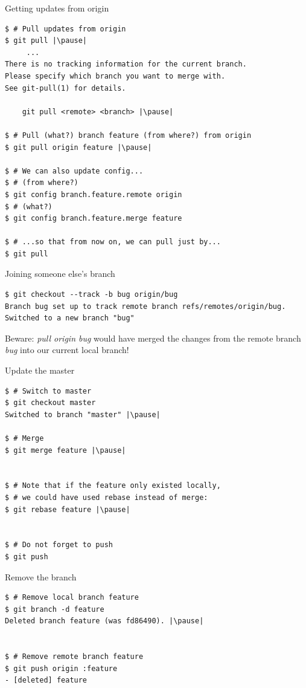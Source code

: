 \begin{frame}[fragile]{Getting updates from origin}
	\begin{lstlisting}
$ # Pull updates from origin
$ git pull |\pause|
     ...
There is no tracking information for the current branch.
Please specify which branch you want to merge with.
See git-pull(1) for details.

    git pull <remote> <branch> |\pause|
    
$ # Pull (what?) branch feature (from where?) from origin
$ git pull origin feature |\pause|

$ # We can also update config...
$ # (from where?)
$ git config branch.feature.remote origin
$ # (what?)
$ git config branch.feature.merge feature

$ # ...so that from now on, we can pull just by...
$ git pull
	\end{lstlisting}
\end{frame}


\begin{frame}[fragile]{Joining someone else's branch}
	\begin{lstlisting}
$ git checkout --track -b bug origin/bug
Branch bug set up to track remote branch refs/remotes/origin/bug.
Switched to a new branch "bug"
	\end{lstlisting}
	
	\pause
	\begin{tiny}
	{\color{eclipsePurple} Beware:} \textit{pull origin bug} would have merged the changes from the remote branch \textit{bug} into our current local branch!
\end{tiny}
\end{frame}

\begin{frame}[fragile]{Update the master}
  	\begin{lstlisting}
$ # Switch to master
$ git checkout master
Switched to branch "master" |\pause|

$ # Merge
$ git merge feature |\pause|


$ # Note that if the feature only existed locally, 
$ # we could have used rebase instead of merge:
$ git rebase feature |\pause|


$ # Do not forget to push
$ git push
	\end{lstlisting}
\end{frame}


\begin{frame}[fragile]{Remove the branch}
  	\begin{lstlisting}
$ # Remove local branch feature
$ git branch -d feature
Deleted branch feature (was fd86490). |\pause|


$ # Remove remote branch feature
$ git push origin :feature
- [deleted] feature
	\end{lstlisting}
\end{frame}


